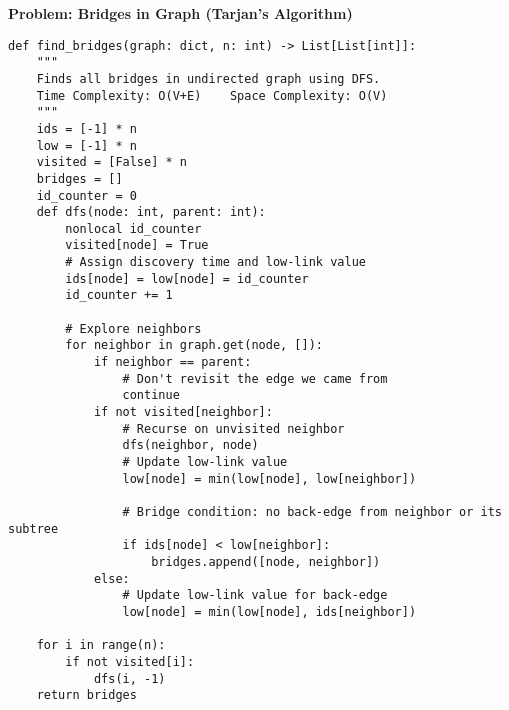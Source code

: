 \noindent\textbf{Problem: Bridges in Graph (Tarjan's Algorithm)}
\begin{verbatim}
def find_bridges(graph: dict, n: int) -> List[List[int]]:
    """
    Finds all bridges in undirected graph using DFS.
    Time Complexity: O(V+E)    Space Complexity: O(V)
    """
    ids = [-1] * n
    low = [-1] * n
    visited = [False] * n
    bridges = []
    id_counter = 0
    def dfs(node: int, parent: int):
        nonlocal id_counter
        visited[node] = True
        # Assign discovery time and low-link value
        ids[node] = low[node] = id_counter
        id_counter += 1

        # Explore neighbors
        for neighbor in graph.get(node, []):
            if neighbor == parent:
                # Don't revisit the edge we came from
                continue
            if not visited[neighbor]:
                # Recurse on unvisited neighbor
                dfs(neighbor, node)
                # Update low-link value
                low[node] = min(low[node], low[neighbor])

                # Bridge condition: no back-edge from neighbor or its subtree
                if ids[node] < low[neighbor]:
                    bridges.append([node, neighbor])
            else:
                # Update low-link value for back-edge
                low[node] = min(low[node], ids[neighbor])
    
    for i in range(n):
        if not visited[i]:
            dfs(i, -1)
    return bridges
\end{verbatim}

